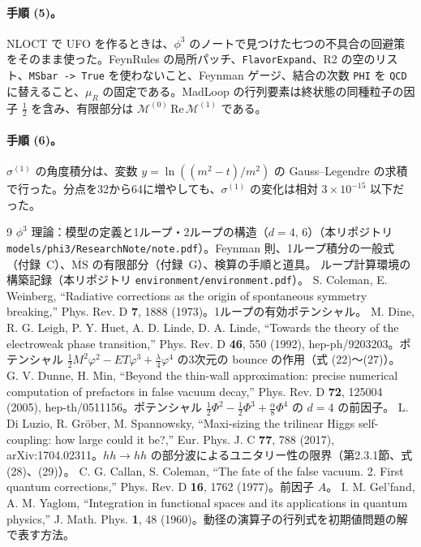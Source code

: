 \documentclass[a4paper,10pt]{ltjsarticle}
\begin{document}
\paragraph{手順 (5)。}NLOCT で UFO を作るときは、$\phi^3$ のノートで見つけた七つの不具合の回避策をそのまま使った。FeynRules の局所パッチ、\texttt{FlavorExpand}、R2 の空のリスト、\texttt{MSbar -> True} を使わないこと、Feynman ゲージ、結合の次数 \texttt{PHI} を \texttt{QCD} に替えること、$\mu_R$ の固定である。MadLoop の行列要素は終状態の同種粒子の因子 $\frac12$ を含み、有限部分は $\mathcal{M}^{(0)}\,\mathrm{Re}\,\mathcal{M}^{(1)}$ である。

\paragraph{手順 (6)。}$\sigma^{(1)}$ の角度積分は、変数 $y=\ln((m^2-t)/m^2)$ の Gauss--Legendre の求積で行った。分点を32から64に増やしても、$\sigma^{(1)}$ の変化は相対 $3\times10^{-15}$ 以下だった。

\begin{thebibliography}{9}
\small
{} $\phi^3$ 理論：模型の定義と1ループ・2ループの構造（$d=4,\,6$）（本リポジトリ \nolinkurl{models/phi3/ResearchNote/note.pdf}）。Feynman 則、1ループ積分の一般式（付録~C）、$\overline{\mathrm{MS}}$ の有限部分（付録~G）、検算の手順と道具。
 ループ計算環境の構築記録（本リポジトリ \nolinkurl{environment/environment.pdf}）。
 S. Coleman, E. Weinberg, ``Radiative corrections as the origin of spontaneous symmetry breaking,'' Phys. Rev. D \textbf{7}, 1888 (1973)。1ループの有効ポテンシャル。
 M. Dine, R. G. Leigh, P. Y. Huet, A. D. Linde, D. A. Linde, ``Towards the theory of the electroweak phase transition,'' Phys. Rev. D \textbf{46}, 550 (1992), hep-ph/9203203。ポテンシャル $\frac12M^2\varphi^2-ET\varphi^3+\frac\lambda4\varphi^4$ の3次元の bounce の作用（式 (22)〜(27)）。
 G. V. Dunne, H. Min, ``Beyond the thin-wall approximation: precise numerical computation of prefactors in false vacuum decay,'' Phys. Rev. D \textbf{72}, 125004 (2005), hep-th/0511156。ポテンシャル $\frac12\Phi^2-\frac12\Phi^3+\frac\alpha8\Phi^4$ の $d=4$ の前因子。
 L. Di Luzio, R. Gr\"ober, M. Spannowsky, ``Maxi-sizing the trilinear Higgs self-coupling: how large could it be?,'' Eur. Phys. J. C \textbf{77}, 788 (2017), arXiv:1704.02311。$hh\to hh$ の部分波によるユニタリー性の限界（第2.3.1節、式 (28)、(29)）。
 C. G. Callan, S. Coleman, ``The fate of the false vacuum. 2. First quantum corrections,'' Phys. Rev. D \textbf{16}, 1762 (1977)。前因子 $A$。
 I. M. Gel'fand, A. M. Yaglom, ``Integration in functional spaces and its applications in quantum physics,'' J. Math. Phys. \textbf{1}, 48 (1960)。動径の演算子の行列式を初期値問題の解で表す方法。
\end{thebibliography}
\end{document}
